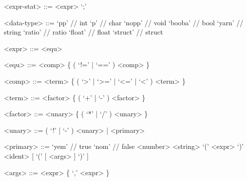 \documentclass[12pt, a4paper]{article}
\begin{document}
\begin{grammar}
        <expr-stat> ::= <expr> `;'

        <data-type> ::= `pp' // int
        \alt `p' // char
        \alt `nopp' // void
        \alt `booba' // bool
        \alt `yarn' // string
        \alt `ratio' // ratio
        \alt `float' // float
        \alt `struct' // struct

        <expr> ::= <equ>

        <equ> ::= <comp> \{ ( `!=' | `==' ) <comp> \}

        <comp> ::= <term> \{ ( `>' | `>=' | `<=' | `<' ) <term> \}

        <term> ::= <factor> \{ ( `+' | `-' ) <factor> \}

        <factor> ::= <unary> \{ ( `*' | `/' ) <unary> \}

        <unary> ::= ( `!' | `-' ) <unary> | <primary>

        <primary> ::= `yem' // true
        \alt `nom' // false
        \alt <number>
        \alt <string>
        \alt `(' <expr> `)'
        \alt <ident> [ `(' [ <args> ] `)' ]

        <args> ::= <expr> \{ `,' <expr> \}
    \end{grammar}
\end{document}
